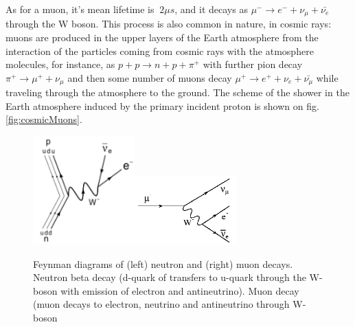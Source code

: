 As for a muon, it's mean lifetime is $~2 {\mu}s$, and it decays as ${\mu}^- \rightarrow e^- + {\nu}_{\mu} + \bar{{\nu}_e}$ through the W boson. This process is also common in nature, in cosmic rays: muons are produced in the upper layers of the Earth atmosphere from the interaction of the particles coming from cosmic rays with the atmosphere molecules, for instance, as $p+p \rightarrow n+p+\pi^+$ with further pion decay $\pi^+ \rightarrow \mu^+ + \nu_\mu$ and then some number of muons decay $\mu^+ \rightarrow e^+ + \nu_e + \bar{\nu_\mu}$ while traveling through the atmosphere to the ground. The scheme of the shower in the Earth atmosphere induced by the primary incident proton is shown on fig. \ref{fig:cosmicMuons}.   

\begin{figure}
\caption{Feynman diagrams of (left) neutron and (right) muon decays. Neutron beta decay (d-quark of transfers to u-quark through the W-boson with emission of electron and antineutrino). Muon decay (muon decays to electron, neutrino and antineutrino through W-boson}
\label{fig:MuonAndNeutronDecays}
\centering
\includegraphics[width=0.35\textwidth, keepaspectratio=true]{figs/NeutronBetaDecay.png}\includegraphics[width=0.35\textwidth, keepaspectratio=true]{figs/MuonDecay.png}
\end{figure}

